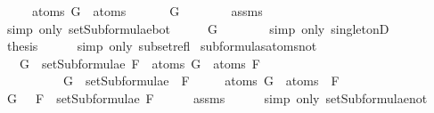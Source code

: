 \begin{isabellebody}
\ \ \ \ \ {\isachardoublequoteopen}atoms\ G\ {\isasymsubseteq}\ atoms\ {\isasymbottom}{\isachardoublequoteclose}\isanewline
%
\isadelimproof
%
\endisadelimproof
%
\isatagproof
{}\isamarkupfalse%
\ {\isacharminus}\isanewline
\ \ \isamarkupfalse%
\ {\isachardoublequoteopen}G\ {\isasymin}\ {\isacharbraceleft}{\isasymbottom}{\isacharbraceright}{\isachardoublequoteclose}\isanewline
\ \ \ \ \isamarkupfalse%
\ assms\isanewline
\ \ \ \ \isamarkupfalse%
\ {\isacharparenleft}simp\ only{\isacharcolon}\ setSubformulae{\isacharunderscore}bot{\isacharparenright}\isanewline
\ \ \isamarkupfalse%
\ \isamarkupfalse%
\ {\isachardoublequoteopen}G\ {\isacharequal}\ {\isasymbottom}{\isachardoublequoteclose}\isanewline
\ \ \ \ \isamarkupfalse%
\ {\isacharparenleft}simp\ only{\isacharcolon}\ singletonD{\isacharparenright}\isanewline
\ \ \isamarkupfalse%
\ \isamarkupfalse%
\ {\isacharquery}thesis\isanewline
\ \ \ \ \isamarkupfalse%
\ {\isacharparenleft}simp\ only{\isacharcolon}\ subset{\isacharunderscore}refl{\isacharparenright}\isanewline
{}\isamarkupfalse%
%
\endisatagproof
{\isafoldproof}%
%
\isadelimproof
\isanewline
%
\endisadelimproof
\isanewline
{}\isamarkupfalse%
\ subformulas{\isacharunderscore}atoms{\isacharunderscore}not{\isacharcolon}\isanewline
\ \ \ {\isachardoublequoteopen}G\ {\isasymin}\ setSubformulae\ F\ {\isasymLongrightarrow}\ atoms\ G\ {\isasymsubseteq}\ atoms\ F{\isachardoublequoteclose}\isanewline
\ \ \ \ \ \ \ \ \ \ {\isachardoublequoteopen}G\ {\isasymin}\ setSubformulae\ {\isacharparenleft}\isactrlbold {\isasymnot}\ F{\isacharparenright}{\isachardoublequoteclose}\isanewline
\ \ \ \ \ {\isachardoublequoteopen}atoms\ G\ {\isasymsubseteq}\ atoms\ {\isacharparenleft}\isactrlbold {\isasymnot}\ F{\isacharparenright}{\isachardoublequoteclose}\isanewline
%
\isadelimproof
%
\endisadelimproof
%
\isatagproof
{}\isamarkupfalse%
\ {\isacharminus}\isanewline
\ \ \isamarkupfalse%
\ {\isachardoublequoteopen}G\ {\isasymin}\ {\isacharbraceleft}\isactrlbold {\isasymnot}\ F{\isacharbraceright}\ {\isasymunion}\ setSubformulae\ F{\isachardoublequoteclose}\isanewline
\ \ \ \ \isamarkupfalse%
\ assms{\isacharparenleft}{}{\isacharparenright}\isanewline
\ \ \ \ \isamarkupfalse%
\ {\isacharparenleft}simp\ only{\isacharcolon}\ setSubformulae{\isacharunderscore}not{\isacharparenright}\ \isanewline

\end{isabellebody}
